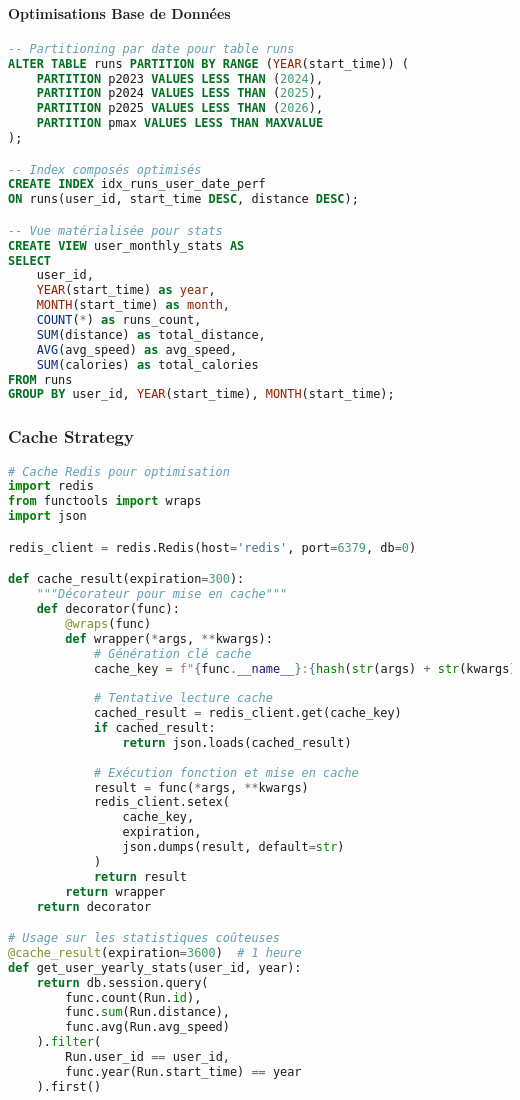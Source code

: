 \paragraph{Optimisations Base de Données}
\begin{lstlisting}[language=sql]
-- Partitioning par date pour table runs
ALTER TABLE runs PARTITION BY RANGE (YEAR(start_time)) (
    PARTITION p2023 VALUES LESS THAN (2024),
    PARTITION p2024 VALUES LESS THAN (2025),
    PARTITION p2025 VALUES LESS THAN (2026),
    PARTITION pmax VALUES LESS THAN MAXVALUE
);

-- Index composés optimisés
CREATE INDEX idx_runs_user_date_perf 
ON runs(user_id, start_time DESC, distance DESC);

-- Vue matérialisée pour stats
CREATE VIEW user_monthly_stats AS
SELECT 
    user_id,
    YEAR(start_time) as year,
    MONTH(start_time) as month,
    COUNT(*) as runs_count,
    SUM(distance) as total_distance,
    AVG(avg_speed) as avg_speed,
    SUM(calories) as total_calories
FROM runs 
GROUP BY user_id, YEAR(start_time), MONTH(start_time);
\end{lstlisting}

\subsubsection{Cache Strategy}

\begin{lstlisting}[language=python]
# Cache Redis pour optimisation
import redis
from functools import wraps
import json

redis_client = redis.Redis(host='redis', port=6379, db=0)

def cache_result(expiration=300):
    """Décorateur pour mise en cache"""
    def decorator(func):
        @wraps(func)
        def wrapper(*args, **kwargs):
            # Génération clé cache
            cache_key = f"{func.__name__}:{hash(str(args) + str(kwargs))}"
            
            # Tentative lecture cache
            cached_result = redis_client.get(cache_key)
            if cached_result:
                return json.loads(cached_result)
            
            # Exécution fonction et mise en cache
            result = func(*args, **kwargs)
            redis_client.setex(
                cache_key, 
                expiration, 
                json.dumps(result, default=str)
            )
            return result
        return wrapper
    return decorator

# Usage sur les statistiques coûteuses
@cache_result(expiration=3600)  # 1 heure
def get_user_yearly_stats(user_id, year):
    return db.session.query(
        func.count(Run.id),
        func.sum(Run.distance),
        func.avg(Run.avg_speed)
    ).filter(
        Run.user_id == user_id,
        func.year(Run.start_time) == year
    ).first()
\end{lstlisting}

